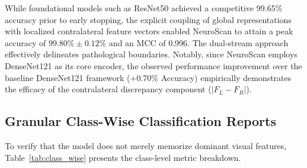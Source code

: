 \documentclass[conference]{IEEEtran}
\begin{document}
\begin{table}[htbp]
\caption{Experimental Performance Comparison Across Deep Learning Backbones on the Isolated Test Cohort ($N=400$)}
\vspace{-2mm}
\label{tab:backbone_results}
\centering
{}
\end{table}

While foundational models such as ResNet50 achieved a competitive 99.65\% accuracy prior to early stopping, the explicit coupling of global representations with localized contralateral feature vectors enabled NeuroScan to attain a peak accuracy of $99.80\% \pm 0.12\%$ and an MCC of 0.996. The dual-stream approach effectively delineates pathological boundaries. Notably, since NeuroScan employs DenseNet121 as its core encoder, the observed performance improvement over the baseline DenseNet121 framework (+0.70\% Accuracy) empirically demonstrates the efficacy of the contralateral discrepancy component ($|F_L - F_R|$).

\subsection{Granular Class-Wise Classification Reports}
To verify that the model does not merely memorize dominant visual features, Table~\ref{tab:class_wise} presents the class-level metric breakdown.
\end{document}
